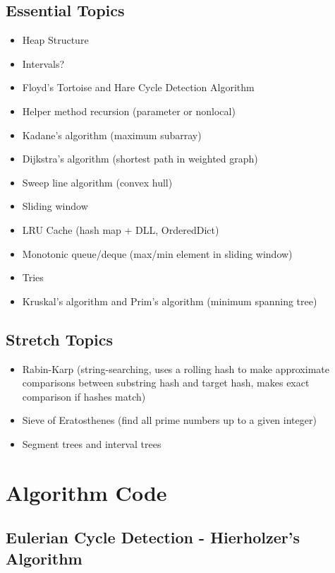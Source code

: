 \documentclass[12pt, titlepage]{article}
\begin{document}
\subsection{Essential Topics}
\begin{itemize}
  \item {\color{red} Heap Structure} %
  \item {\color{red} Intervals?}
  \item Floyd's Tortoise and Hare Cycle Detection Algorithm
  \item Helper method recursion (parameter or nonlocal)
  \item Kadane's algorithm (maximum subarray)
  \item Dijkstra's algorithm (shortest path in weighted graph)
  \item Sweep line algorithm (convex hull)
  \item Sliding window
  \item LRU Cache (hash map + DLL, OrderedDict)
  \item Monotonic queue/deque (max/min element in sliding window) %
  \item Tries
  \item Kruskal's algorithm and Prim's algorithm (minimum spanning tree)
\end{itemize}

\subsection{Stretch Topics}
\begin{itemize}
  \item Rabin-Karp (string-searching, uses a rolling hash to make approximate comparisons between substring hash and target hash, makes exact comparison if hashes match)
  \item Sieve of Eratosthenes (find all prime numbers up to a given integer)
  \item Segment trees and interval trees
\end{itemize}

\appendix

\section{Algorithm Code}

\subsection{Eulerian Cycle Detection - Hierholzer's Algorithm}
\end{document}
